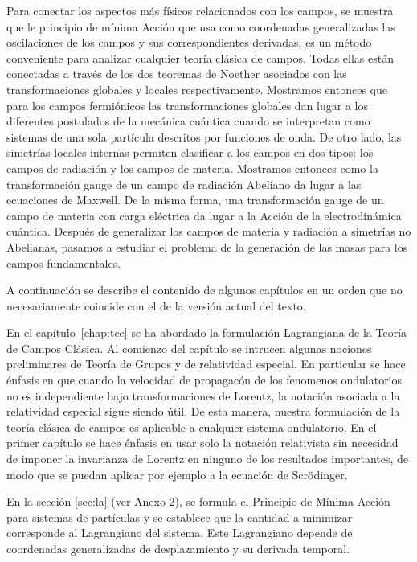 Para conectar los aspectos más físicos relacionados con los campos, se muestra que le principio de mínima Acción que usa como coordenadas generalizadas las oscilaciones de los campos y sus correspondientes derivadas, es un método conveniente para analizar cualquier teoría clásica de campos. Todas ellas están conectadas a través de los dos teoremas de Noether asociados con las transformaciones globales y locales respectivamente.  Mostramos entonces que para los campos fermiónicos las transformaciones globales dan lugar a los diferentes postulados de la mecánica cuántica cuando se interpretan como sistemas de una sola partícula descritos por funciones de onda. 
De otro lado, las simetrías locales internas permiten clasificar a los campos en dos tipos: los campos de radiación y los campos de materia. Mostramos entonces como la transformación gauge de un campo de radiación Abeliano da lugar a las ecuaciones de Maxwell.  De la misma forma, una transformación gauge de un campo de materia con carga eléctrica da lugar a la Acción de la electrodinámica cuántica. Después de generalizar los campos de materia y radiación a simetrías no Abelianas, pasamos a estudiar el problema de la generación de las masas para los campos fundamentales. 

A continuación se describe el contenido de algunos capítulos en un orden que no necesariamente coincide con el de la versión actual del texto.

En el capítulo~\ref{chap:tcc} se ha abordado la formulación Lagrangiana de la Teoría de Campos Clásica.
Al comienzo del capítulo se intrucen algunas nociones preliminares de Teoría de Grupos y de relatividad especial. En particular se hace énfasis en que cuando la velocidad de propagacón de los fenomenos ondulatorios no es independiente bajo transformaciones de Lorentz, la notación asociada a la relatividad especial sigue siendo útil. De esta manera, nuestra formulación de la teoría clásica de campos es aplicable a cualquier sistema ondulatorio. En el primer capítulo se hace énfasis en usar solo la notación relativista sin necesidad de imponer la invarianza de Lorentz en ninguno de los resultados importantes, de modo que se puedan aplicar por ejemplo a la ecuación de Scrödinger. 

En la sección \ref{sec:la} (ver Anexo 2), se formula el Principio de Mínima Acción para sistemas de partículas y se establece que la cantidad a minimizar corresponde al Lagrangiano del sistema. Este Lagrangiano depende de coordenadas generalizadas de desplazamiento y su derivada temporal. 


